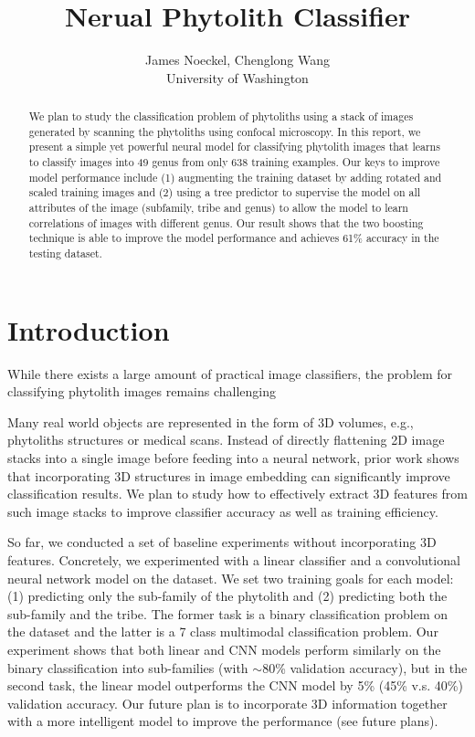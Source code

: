 \documentclass{article}
\title{Nerual Phytolith Classifier}
\author{
  James Noeckel, Chenglong Wang\\
  University of Washington
}
\begin{document}

\maketitle

\begin{abstract}
  We plan to study the classification problem of phytoliths using a stack of images generated by scanning the phytoliths using confocal microscopy. In this report, we present a simple yet powerful neural model for classifying phytolith images that learns to classify images into 49 genus from only 638 training examples. Our keys to improve model performance include (1) augmenting the training dataset by adding rotated and scaled training images and (2) using a tree predictor to supervise the model on all attributes of the image (subfamily, tribe and genus) to allow the model to learn correlations of images with different genus. Our result shows that the two boosting technique is able to improve the model performance and achieves 61\% accuracy in the testing dataset.
\end{abstract}

\section{Introduction}

While there exists a large amount of practical image classifiers, the problem for classifying phytolith images remains challenging

Many real world objects are represented in the form of 3D volumes, e.g., phytoliths structures or medical scans. Instead of directly flattening 2D image stacks into a single image before feeding into a neural network, prior work shows that incorporating 3D structures in image embedding can significantly improve classification results. We plan to study how to effectively extract 3D features from such image stacks to improve classifier accuracy as well as training efficiency.

So far, we conducted a set of baseline experiments without incorporating 3D features. Concretely, we experimented with a linear classifier and a convolutional neural network model on the dataset. We set two training goals for each model: (1) predicting only the sub-family of the phytolith and (2) predicting both the sub-family and the tribe. The former task is a binary classification problem on the dataset and the latter is a 7 class multimodal classification problem. Our experiment shows that both linear and CNN models perform similarly on the binary classification into sub-families (with $\sim$80\% validation accuracy), but in the second task, the linear model outperforms the CNN model by 5\% (45\% v.s. 40\%) validation accuracy. Our future plan is to incorporate 3D information together with a more intelligent model to improve the performance (see future plans).
\end{document}
